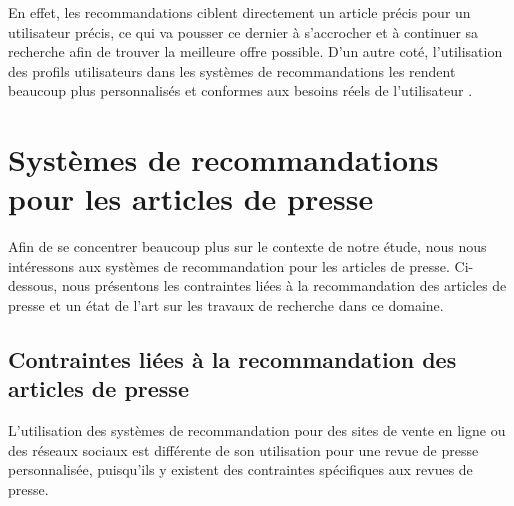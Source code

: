 En effet, les recommandations ciblent directement un article précis pour un utilisateur précis, ce qui va pousser ce dernier à s'accrocher et à continuer sa recherche afin de trouver la meilleure offre possible. D'un autre coté, l'utilisation des profils utilisateurs dans les systèmes de recommandations les rendent beaucoup plus personnalisés et conformes aux besoins réels de l'utilisateur \cite{figfiltering}.

\section{Systèmes de recommandations pour les articles de presse}
Afin de se concentrer beaucoup plus sur le contexte de notre étude, nous nous intéressons aux systèmes de recommandation pour les articles de presse. Ci-dessous, nous présentons les contraintes liées à la recommandation des articles de presse et un état de l'art sur les travaux de recherche dans ce domaine.

\subsection{Contraintes liées à la recommandation des articles de presse}
L'utilisation des systèmes de recommandation pour des sites de vente en ligne ou des réseaux sociaux est différente de son utilisation pour une revue de presse personnalisée, puisqu'ils y existent des contraintes spécifiques aux revues de presse.

